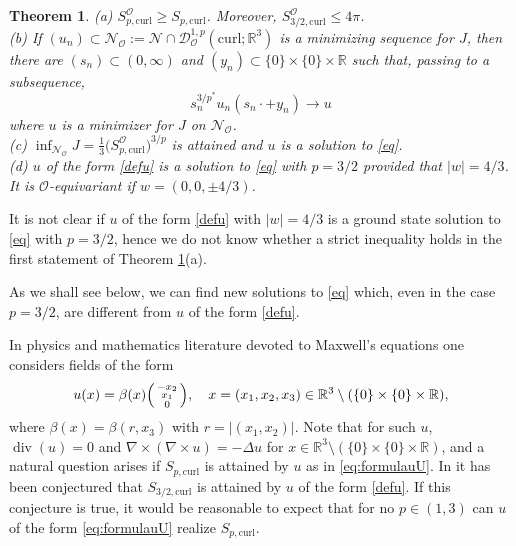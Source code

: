\documentclass[12pt,leqno,twoside]{amsart}
\newtheorem{Th}{Theorem}[section]
\def\div{\mathop{\mathrm{div}}}
\def\R{\mathbb{R}}
\def\curl{\mathrm{curl}}
\newcommand{\UU}{u}
\newcommand{\cD}{{\mathcal D}}
\newcommand{\cN}{{\mathcal N}}
\newcommand{\cO}{{\mathcal O}}
\def\Wco{\cD^{1,p}_{\cO}(\curl;\R^3)}
\def\curlop{\nabla\times}
\numberwithin{equation}{section}
\begin{document}
\begin{Th}\label{Th:main2}
	(a) $S_{p,\curl}^{\cO}\geq S_{p,\curl}$. Moreover, $S_{3/2,\curl}^{\cO}\leq4\pi$.\\
	(b)  If $(u_n)\subset \cN_\cO:=\cN\cap\Wco$ is a minimizing sequence for $J$, then there are $(s_n)\subset (0,\infty)$ and $(y_n)\subset \{0\}\times\{0\}\times\R$ such that, passing to a subsequence, 
	$$
	s_n^{3/p^*}u_n(s_n\cdot+y_n)\to u
	$$ 
	where $u$ is a minimizer for $J$ on $\cN_\cO$.\\
	(c) $\inf_{\cN_\cO}J=\frac13\big(S_{p,\curl}^{\cO}\big)^{3/p}$ is attained and  $u$ is a solution to \eqref{eq}.
\\
(d)  $u$ of the form \eqref{defu} is a solution to \eqref{eq} with $p=3/2$ provided that $|w|=4/3$. It is $\cO$-equivariant if $w=(0,0, \pm4/3)$. 
\end{Th}
It is not clear if $u$ of the form \eqref{defu} with $|w|=4/3$ is a ground state solution  to \eqref{eq} with $p=3/2$, hence we do not know whether a strict inequality holds in the first statement of Theorem \ref{Th:main2}(a).

As we shall see below, we can find new solutions to \eqref{eq} which, even in the case $p=3/2$, are different from  $u$ of the form \eqref{defu}.


In physics and mathematics literature devoted to Maxwell's equations one considers fields of the form
\begin{equation}\label{eq:formulauU}
u(x)=\beta(x)\Bigl(\begin{smallmatrix}
-x_2\\
x_1\\
0
\end{smallmatrix}\Bigr),\quad x=(x_1,x_2,x_3)\in\R^3\setminus(\{0\}\times\{0\}\times\R),
\end{equation}
where $\beta(x)=\beta(r,x_3)$ with $r=|(x_1,x_2)|$. Note that
for such $u$, $\div(\UU)=0$ and $\curlop(\curlop u)=-\Delta u$ for $x\in\R^3\setminus(\{0\}\times\{0\}\times\R)$, and a natural question arises if $S_{p,\curl}$ is attained by $u$ as in \eqref{eq:formulauU}. In \cite{FrankLoss2} it has been conjectured that $S_{3/2,\curl}$ is attained by $u$ of the form \eqref{defu}. 
If this conjecture is true, it would be reasonable to expect that for no $p\in(1,3)$ can $u$ of the form \eqref{eq:formulauU} realize $S_{p,\curl}$. 
\end{document}
